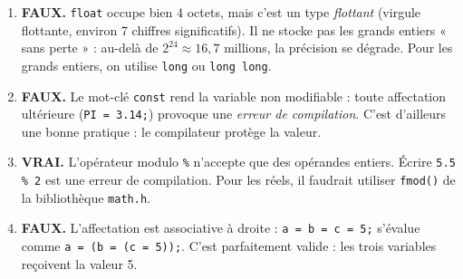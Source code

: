 \documentclass[11pt]{article}
\newcommand{\cle}[1]{{\popxbold\color{popdark}#1}}
\begin{document}
\begin{corrige}
\begin{enumerate}
    \item \textbf{FAUX.} \texttt{float} occupe bien 4 octets, mais c'est un type \emph{flottant} (virgule flottante, environ 7 chiffres significatifs). Il ne stocke pas les grands entiers « sans perte » : au-delà de $2^{24} \approx 16,7$ millions, la précision se dégrade. Pour les grands entiers, on utilise \texttt{long} ou \texttt{long long}.
    \item \textbf{FAUX.} Le mot-clé \texttt{const} rend la variable \cle{non modifiable} : toute affectation ultérieure (\texttt{PI = 3.14;}) provoque une \emph{erreur de compilation}. C'est d'ailleurs une bonne pratique : le compilateur protège la valeur.
    \item \textbf{VRAI.} L'opérateur modulo \texttt{\%} n'accepte que des opérandes entiers. Écrire \texttt{5.5 \% 2} est une erreur de compilation. Pour les réels, il faudrait utiliser \texttt{fmod()} de la bibliothèque \texttt{math.h}.
    \item \textbf{FAUX.} L'affectation est \cle{associative à droite} : \texttt{a = b = c = 5;} s'évalue comme \texttt{a = (b = (c = 5));}. C'est parfaitement valide : les trois variables reçoivent la valeur 5.
\end{enumerate}
\end{corrige}
\end{document}
